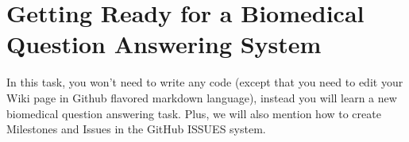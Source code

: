 
\chapter{Getting Ready for a Biomedical Question Answering System}

In this task, you won't need to write any code (except that you need to edit
your Wiki page in Github flavored markdown language), instead you will learn a
new biomedical question answering task. Plus, we will also mention how to create
Milestones and Issues in the GitHub ISSUES system. 






%
